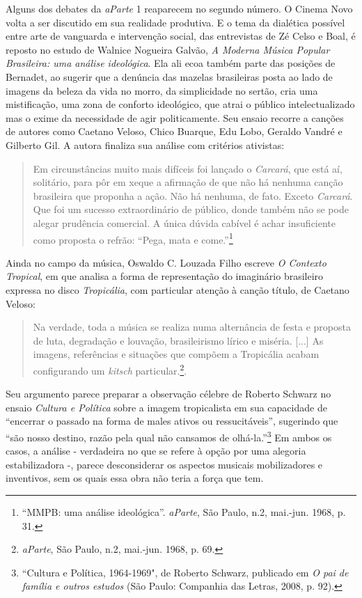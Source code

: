 Alguns dos debates da \textit{aParte} 1 reaparecem no segundo número. O
Cinema Novo volta a ser discutido em sua realidade produtiva. E o tema
da dialética possível entre arte de vanguarda e intervenção social, das
entrevistas de Zé Celso e Boal, é reposto no estudo de Walnice Nogueira
Galvão, \textit{A Moderna Música Popular Brasileira: uma análise
ideológica}. Ela ali ecoa também parte das posições de Bernadet, ao
sugerir que a denúncia das mazelas brasileiras posta ao lado de imagens
da beleza da vida no morro, da simplicidade no sertão, cria uma
mistificação, uma zona de conforto ideológico, que atrai o público
intelectualizado mas o exime da necessidade de agir politicamente. Seu
ensaio recorre a canções de autores como Caetano Veloso, Chico Buarque,
Edu Lobo, Geraldo Vandré e Gilberto Gil. A autora finaliza sua análise
com critérios ativistas:

\begin{quote}
Em circunstâncias muito mais difíceis foi lançado o \textit{Carcará}, que
está aí, solitário, para pôr em xeque a afirmação de que não há nenhuma
canção brasileira que proponha a ação. Não há nenhuma, de fato. Exceto
\textit{Carcará}. Que foi um sucesso extraordinário de público, donde
também não se pode alegar prudência comercial. A única dúvida cabível é
achar insuficiente como proposta o refrão: “Pega, mata e
come.”\footnote{“MMPB: uma análise ideológica”. \textit{aParte}, São Paulo,
  n.2, mai.-jun. 1968, p. 31.}
\end{quote}

Ainda no campo da música, Oswaldo C. Louzada Filho escreve \textit{O
Contexto Tropical}, em que analisa a forma de representação do
imaginário brasileiro expressa no disco \textit{Tropicália}, com particular
atenção à canção título, de Caetano Veloso:

\begin{quote}
Na verdade, toda a música se realiza numa alternância de festa e
proposta de luta, degradação e louvação, brasileirismo lírico e miséria.
{[}...{]} As imagens, referências e situações que compõem a Tropicália
acabam configurando um \textit{kitsch} particular.\footnote{\textit{aParte},
  São Paulo, n.2, mai.-jun. 1968, p. 69.}.
\end{quote}

Seu argumento parece preparar a observação célebre de Roberto Schwarz no
ensaio \textit{Cultura e Política} sobre a imagem tropicalista em sua
capacidade de “encerrar o passado na forma de males ativos ou
ressucitáveis”, sugerindo que “são nosso destino, razão pela qual não
cansamos de olhá-la.”\footnote{“Cultura e Política, 1964-1969", de
  Roberto Schwarz, publicado em \textit{O pai de família e outros estudos}
  (São Paulo: Companhia das Letras, 2008, p. 92).} Em ambos os casos, a
análise - verdadeira no que se refere à opção por uma alegoria
estabilizadora -, parece desconsiderar os aspectos musicais
mobilizadores e inventivos, sem os quais essa obra não teria a força que
tem.

